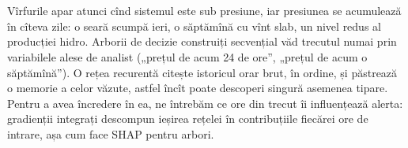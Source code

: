 \section{}
\begin{intuition}
%
{Vîrfurile apar atunci cînd sistemul este sub presiune, iar presiunea se acumulează în cîteva zile: o seară scumpă ieri, o săptămînă cu vînt slab, un nivel redus al producției hidro.
Arborii de decizie construiți secvențial văd trecutul numai prin variabilele alese de analist („prețul de acum 24 de ore”, „prețul de acum o săptămînă”). O rețea recurentă citește istoricul orar brut, în ordine, și păstrează o memorie a celor văzute, astfel încît poate descoperi singură asemenea tipare.
Pentru a avea încredere în ea, ne întrebăm ce ore din trecut îi influențează alerta: gradienții integrați descompun ieșirea rețelei în contribuțiile fiecărei ore de intrare, așa cum face SHAP pentru arbori.}
\end{intuition}

